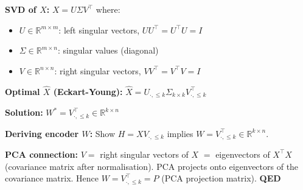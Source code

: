 \documentclass[12pt,a4paper]{article}
\newcommand{\R}{\mathbb{R}}
\begin{document}
\textbf{SVD of $X$:}
$X = U\Sigma V^\top$ where:
\begin{itemize}
  \item $U \in \R^{m\times m}$: left singular vectors, $UU^\top = U^\top U = I$
  \item $\Sigma \in \R^{m\times n}$: singular values (diagonal)
  \item $V \in \R^{n\times n}$: right singular vectors, $VV^\top = V^\top V = I$
\end{itemize}

\textbf{Optimal $\hat{X}$ (Eckart-Young):}
$\hat{X} = U_{\cdot,\leq k}\Sigma_{k\times k}V_{\cdot,\leq k}^\top$

\textbf{Solution:} $W^* = V_{\cdot,\leq k}^\top \in \R^{k\times n}$

\textbf{Deriving encoder $W$:} Show $H = XV_{\cdot,\leq k}$ implies $W = V_{\cdot,\leq k}^\top \in \R^{k\times n}$.

\textbf{PCA connection:} $V = $ right singular vectors of $X$ $=$ eigenvectors of $X^\top X$ (covariance matrix after normalisation). PCA projects onto eigenvectors of the covariance matrix. Hence $W = V_{\cdot,\leq k}^\top = P$ (PCA projection matrix). \hfill\textbf{QED}
\end{document}
